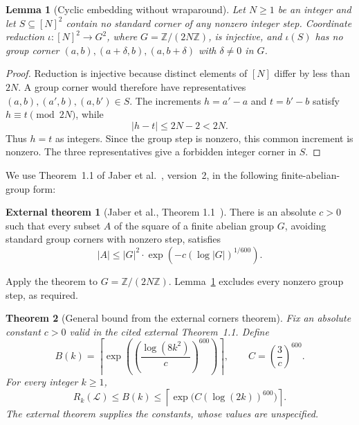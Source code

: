 \documentclass[11pt,a4paper]{article}
\newtheorem{theorem}{Theorem}[section]
\newtheorem{lemma}[theorem]{Lemma}
\theoremstyle{definition}
\newtheorem*{external}{External theorem}
\newcommand{\Lconf}{\mathcal L}
\newcommand{\Z}{\mathbb Z}
\numberwithin{equation}{section}
\begin{document}
\begin{lemma}[Cyclic embedding without wraparound]\label{lem:embed}
	Let $N\ge1$ be an integer and let $S\subseteq[N]^2$ contain no standard corner of any nonzero integer step. Coordinate reduction $\iota:[N]^2\to G^2$, where $G=\Z/(2N\Z)$, is injective, and $\iota(S)$ has no group corner $(a,b),(a+\delta,b),(a,b+\delta)$ with $\delta\ne0$ in $G$.
\end{lemma}
\begin{proof}
	Reduction is injective because distinct elements of $[N]$ differ by less than $2N$. A group corner would therefore have representatives $(a,b),(a',b),(a,b')\in S$. The increments $h=a'-a$ and $t=b'-b$ satisfy $h\equiv t\pmod{2N}$, while
	\[
	|h-t|\le2N-2<2N.
	\]
	Thus $h=t$ as integers. Since the group step is nonzero, this common increment is nonzero. The three representatives give a forbidden integer corner in $S$.
\end{proof}

We use Theorem~1.1 of Jaber et al.~\cite{JLLOS25}, version~2, in the following finite-abelian-group form:
\begin{external}[Jaber et al., Theorem 1.1~\cite{JLLOS25}] There is an absolute $c>0$ such that every subset $A$ of the square of a finite abelian group $G$, avoiding standard group corners with nonzero step, satisfies
	\begin{equation}\label{eq:appendix-result-8}
|A|\le|G|^2\cdot\exp(-c(\log|G|)^{1/600}).
\end{equation}
\end{external}
Apply the theorem to $G=\Z/(2N\Z)$. Lemma~\ref{lem:embed} excludes every nonzero group step, as required.

\begin{theorem}[General bound from the external corners theorem]\label{thm:general}
	Fix an absolute constant $c>0$ valid in the cited external Theorem~1.1. Define
	\begin{equation}\label{eq:appendix-result-9}
B(k)=\left\lceil\exp\!\left(\left(\frac{\log(8k^2)}{c}\right)^{600}\right)\right\rceil,
	\qquad C=\left(\frac3c\right)^{600}.
\end{equation}
	For every integer $k\ge1$,
	\begin{equation}\label{eq:appendix-result-10}
R_k(\Lconf)\le B(k)\le\left\lceil\exp\!\bigl(C(\log(2k))^{600}\bigr)\right\rceil.
\end{equation}
	The external theorem supplies the constants, whose values are unspecified.
\end{theorem}
\end{document}
